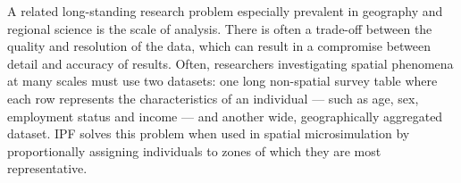 \documentclass[a4paper,10pt]{article}
\begin{document}
A related long-standing research problem especially prevalent in geography and regional science
is the scale of analysis. There is often a trade-off between the quality and resolution
of the data, which can result in a compromise between detail and accuracy of results.
Often, researchers investigating
spatial phenomena at many scales must use two datasets: one long non-spatial
survey table where each row represents the characteristics of an individual --- such as
age, sex, employment status and income --- and another wide, geographically aggregated
dataset. IPF solves this problem when used in
spatial microsimulation by proportionally assigning individuals to zones of which they
are most representative.

\end{document}
